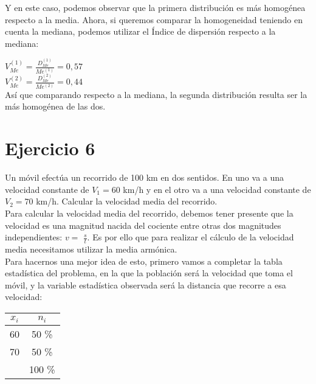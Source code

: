 \documentclass[a4paper,12pt]{article}
\begin{document}
\begin{itemize}
    Y en este caso, podemos observar que la primera distribución es más homogénea respecto a la media. Ahora, si queremos comparar la homogeneidad teniendo en cuenta la mediana, podemos utilizar el Índice de dispersión respecto a la mediana:
    
    $V_{Me}^{(1)}=\frac{D_{Me}^{(1)}}{Me^{(1)}}=0,57$\\
    $V_{Me}^{(2)}=\frac{D_{Me}^{(2)}}{Me^{(2)}}=0,44$\\

    Así que comparando respecto a la mediana, la segunda distribución resulta ser la más homogénea de las dos.\\
    
    
\end{itemize}

    
    
    
\section*{Ejercicio 6}
Un móvil efectúa un recorrido de 100 km en dos sentidos. En uno va a una velocidad constante de $V_1=60$ km/h y en el otro va a una velocidad constante de $V_2=70$ km/h. Calcular la velocidad media del recorrido. \\

Para calcular la velocidad media del recorrido, debemos tener presente que la velocidad es una magnitud nacida del cociente entre otras dos magnitudes independientes: $v =$ $\frac{s}{t}$. Es por ello que para realizar el cálculo de la velocidad media necesitamos utilizar la media armónica.\\
Para hacernos una mejor idea de esto, primero vamos a completar la tabla estadística del problema, en la que la población será la velocidad que toma el móvil, y la variable estadística observada será la distancia que recorre a esa velocidad: \\

\begin {center}
    \begin{tabular}{|c|c|}
            \hline
            $x_i$ & $n_i$ \\
            \hline
            60 & 50 \% \\
            70 & 50 \% \\
            \hline
            & 100 \% \\
            \hline
    \end{tabular}
\end {center}
\end{document}
